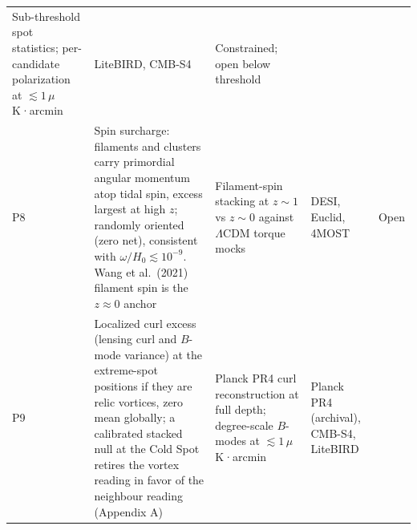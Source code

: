 \documentclass[
]{article}
\begin{document}
\begin{longtable}[]{@{}lllll@{}}
\begin{minipage}[t]{0.19\columnwidth}
Sub-threshold spot statistics; per-candidate polarization at
\(\lesssim 1\,\mu\)K·arcmin\strut
\end{minipage} & \begin{minipage}[t]{0.19\columnwidth}\raggedright
LiteBIRD, CMB-S4\strut
\end{minipage} & \begin{minipage}[t]{0.19\columnwidth}\raggedright
Constrained; open below threshold\strut
\end{minipage}\tabularnewline
\begin{minipage}[t]{0.11\columnwidth}\raggedright
P8\strut
\end{minipage} & \begin{minipage}[t]{0.19\columnwidth}\raggedright
Spin surcharge: filaments and clusters carry primordial angular momentum
atop tidal spin, excess largest at high \(z\); randomly oriented (zero
net), consistent with \(\omega/H_0 \lesssim 10^{-9}\). Wang et
al.~(2021) filament spin is the \(z \approx 0\) anchor\strut
\end{minipage} & \begin{minipage}[t]{0.19\columnwidth}\raggedright
Filament-spin stacking at \(z \sim 1\) vs \(z \sim 0\) against
\(\Lambda\)CDM torque mocks\strut
\end{minipage} & \begin{minipage}[t]{0.19\columnwidth}\raggedright
DESI, Euclid, 4MOST\strut
\end{minipage} & \begin{minipage}[t]{0.19\columnwidth}\raggedright
Open\strut
\end{minipage}\tabularnewline
\begin{minipage}[t]{0.11\columnwidth}\raggedright
P9\strut
\end{minipage} & \begin{minipage}[t]{0.19\columnwidth}\raggedright
Localized curl excess (lensing curl and \(B\)-mode variance) at the
extreme-spot positions if they are relic vortices, zero mean globally; a
calibrated stacked null at the Cold Spot retires the vortex reading in
favor of the neighbour reading (Appendix A)\strut
\end{minipage} & \begin{minipage}[t]{0.19\columnwidth}\raggedright
Planck PR4 curl reconstruction at full depth; degree-scale \(B\)-modes
at \(\lesssim 1\,\mu\)K·arcmin\strut
\end{minipage} & \begin{minipage}[t]{0.19\columnwidth}\raggedright
Planck PR4 (archival), CMB-S4, LiteBIRD\strut

\end{minipage}
\end{longtable}
\end{document}
